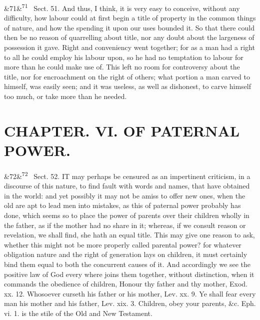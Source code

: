 \documentclass[12pt]{article}
\newcommand{\para}[1][]{\par\noindent\ifx&#1&\else\textsuperscript{\footnotesize #1}~\fi}
\begin{document}
\para[71] Sect. 51. And thus, I think, it is very easy to conceive, without any difficulty, how labour could at first begin a title of property in the common things of nature, and how the spending it upon our uses bounded it. So that there could then be no reason of quarrelling about title, nor any doubt about the largeness of possession it gave. Right and conveniency went together; for as a man had a right to all he could employ his labour upon, so he had no temptation to labour for more than he could make use of. This left no room for controversy about the title, nor for encroachment on the right of others; what portion a man carved to himself, was easily seen; and it was useless, as well as dishonest, to carve himself too much, or take more than he needed.

\section*{CHAPTER. VI. OF PATERNAL POWER.}

\para[72] Sect. 52. IT may perhaps be censured as an impertinent criticism, in a discourse of this nature, to find fault with words and names, that have obtained in the world: and yet possibly it may not be amiss to offer new ones, when the old are apt to lead men into mistakes, as this of paternal power probably has done, which seems so to place the power of parents over their children wholly in the father, as if the mother had no share in it; whereas, if we consult reason or revelation, we shall find, she hath an equal title. This may give one reason to ask, whether this might not be more properly called parental power? for whatever obligation nature and the right of generation lays on children, it must certainly bind them equal to both the concurrent causes of it. And accordingly we see the positive law of God every where joins them together, without distinction, when it commands the obedience of children, Honour thy father and thy mother, Exod. xx. 12. Whosoever curseth his father or his mother, Lev. xx. 9. Ye shall fear every man his mother and his father, Lev. xix. 3. Children, obey your parents, \&c. Eph. vi. 1. is the stile of the Old and New Testament.
\end{document}
